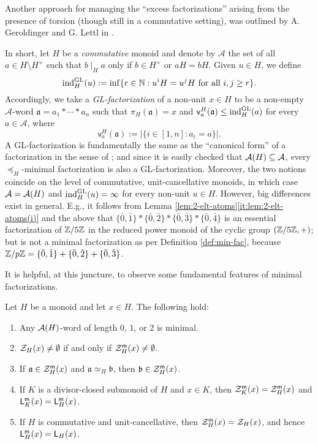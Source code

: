 \begin{rk}\label{rem:geroldinger&lettl}
Another approach for managing the ``excess factorizations'' arising from the presence of torsion (though still in a commutative setting), was outlined by A. Geroldinger and G. Lettl in \cite{geroldinger-lettl90}. 

In short, let $H$ be a \emph{commutative} monoid and denote by $\mathcal A$ the set of all $a \in H \setminus H^\times$ such that $b \mid_H a$ only if $b \in H^\times$ or $aH = bH$. Given $u \in H$, we define 
\[
\textrm{ind}_H^{\rm GL}(u) := \inf \{r\in \mathbb{N}: u^i H = u^j H \textrm{ for all } i, j \ge r\}.
\]
Accordingly, we take a \emph{\textup{GL}-factorization} of a non-unit $x \in H$ to be a non-empty $\mathcal A$-word $\mathfrak a = a_1 \ast \cdots \ast a_n$ such that $\pi_H(\mathfrak a) = x$ and $\mathsf v_a^H(\mathfrak a) \le \text{ind}_H^{\rm GL}(a)$ for every $a \in \mathcal A$, where
\[
\mathsf v_a^H(\mathfrak a) := \bigl|\{i \in [ 1, n ]: a_i = a\}\bigr|.
\]
A \textup{GL}-factorization is fundamentally the same as the ``canonical form'' of a factorization in the sense of \cite{geroldinger-lettl90}; and since it is easily checked that $\mathcal{A}(H) \subseteq \mathcal A$, every $\preceq_H$-minimal factorization is also a \textup{GL}-factorization. Moreover, the two notions coincide on the level of commutative, unit-cancellative monoids, in which case $\mathcal A = \mathcal{A}(H)$ and $\text{ind}_H^{\rm GL}(u) = \infty$ for every non-unit $u \in H$.
However, big differences exist in general. E.g., it follows from Lemma \ref{lem:2-elt-atoms}\ref{it:lem:2-elt-atoms(i)} and the above that $\{\bar{0}, \bar{1}\} \ast \{\bar{0}, \bar{2}\} \ast \{\bar{0}, \bar{3}\} \ast \{\bar{0}, \bar{4}\}$ is an essential factorization of $\mathbb{Z}/5\mathbb{Z}$ in the reduced power monoid of the cyclic group $(\mathbb{Z}/5\mathbb{Z}, +)$; but is not a minimal factorization as per Definition \ref{def:min-fac}, because $\mathbb{Z}/p\mathbb{Z} = \{\bar{0}, \bar{1}\} + \{\bar{0}, \bar{2}\} + \{\bar{0}, \bar{3}\}$.
\end{rk}
%
It is helpful, at this juncture, to observe some fundamental features of minimal factorizations.
%
\begin{prop}\label{prop:min-basics}
	Let $H$ be a monoid and let $x\in H$. The following hold:
	\begin{enumerate}[label = {\rm (\roman{*})}]
		\item\label{it:prop:min-basics(i)} Any $\mathcal{A}(H)$-word of length $0$, $1$, or $2$ is minimal.
		\item\label{it:prop:min-basics(ii)} $\mathcal{Z}_H(x) \ne \emptyset$ if and only if  $\mathcal{Z}_H^{\mathsf{m}}(x) \ne \emptyset$.
		\item\label{it:prop:min-basics(iib)} If $\mathfrak a \in \mathcal Z_H^{\mathsf{m}}(x)$ and $\mathfrak a \simeq_H \mathfrak b$, then $\mathfrak b \in \mathcal Z_H^{\mathsf{m}}(x)$.
		\item\label{it:prop:min-basics(iii)} If $K$ is a divisor-closed submonoid of $H$ and $x \in K$, then $\mathcal{Z}_K^{\mathsf{m}}(x) = \mathcal{Z}_H^{\mathsf{m}}(x)$ and $\mathsf L_K^{\mathsf{m}}(x) = \mathsf L_H^{\mathsf{m}}(x)$.
		\item\label{it:prop:min-basics(iv)} If $H$ is commutative and unit-cancellative, then $\mathcal{Z}_H^{\mathsf{m}}(x) = \mathcal{Z}_H(x)$, and hence $\mathsf L_H^{\mathsf{m}}(x) = \mathsf L_H(x)$.
	\end{enumerate}
\end{prop}
